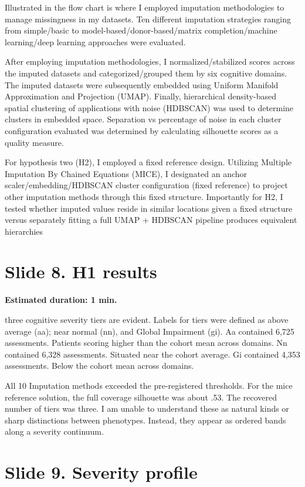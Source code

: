 \documentclass[
  11pt,
]{article}
\begin{document}
Illustrated in the flow chart is where I employed imputation
methodologies to manage missingness in my datasets. Ten different
imputation strategies ranging from simple/basic to
model-based/donor-based/matrix completion/machine learning/deep learning
approaches were evaluated.

After employing imputation methodologies, I normalized/stabilized scores
across the imputed datasets and categorized/grouped them by six
cognitive domains. The imputed datasets were subsequently embedded using
Uniform Manifold Approximation and Projection (UMAP). Finally,
hierarchical density-based spatial clustering of applications with noise
(HDBSCAN) was used to determine clusters in embedded space. Separation
vs percentage of noise in each cluster configuration evaluated was
determined by calculating silhouette scores as a quality measure.

For hypothesis two (H2), I employed a fixed reference design. Utilizing
Multiple Imputation By Chained Equations (MICE), I designated an anchor
scaler/embedding/HDBSCAN cluster configuration (fixed reference) to
project other imputation methods through this fixed structure.
Importantly for H2, I tested whether imputed values reside in similar
locations given a fixed structure versus separately fitting a full UMAP
+ HDBSCAN pipeline produces equivalent hierarchies

\section{Slide 8. H1 results}\label{slide-8.-h1-results}

\textbf{Estimated duration: 1 min.}

three cognitive severity tiers are evident. Labels for tiers were
defined as above average (aa); near normal (nn), and Global Impairment
(gi). Aa contained 6,725 assessments. Patients scoring higher than the
cohort mean across domains. Nn contained 6,328 assessments. Situated
near the cohort average. Gi contained 4,353 assessments. Below the
cohort mean across domains.

All 10 Imputation methods exceeded the pre-registered thresholds. For
the mice reference solution, the full coverage silhouette was about .53.
The recovered number of tiers was three. I am unable to understand these
as natural kinds or sharp distinctions between phenotypes. Instead, they
appear as ordered bands along a severity continuum.

\section{Slide 9. Severity profile}\label{slide-9.-severity-profile}
\end{document}
